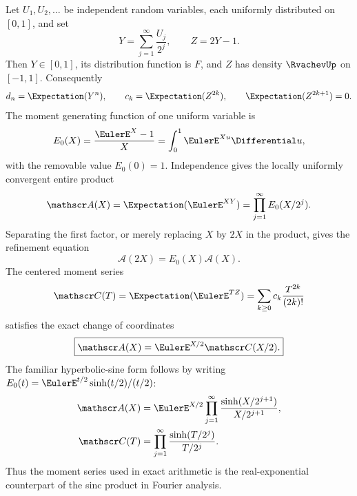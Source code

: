 \documentclass[11pt,oneside]{article}
\theoremstyle{definition}
\theoremstyle{remark}
\begin{document}
Let $U_1,U_2,\ldots$ be independent random variables, each uniformly distributed on
$[0,1]$, and set
\begin{equation}
 Y=\sum_{j=1}^{\infty}\frac{U_j}{2^j},
 \qquad Z=2Y-1.                                             \label{dyadicweb:eq:Y-Z-def}
\end{equation}
Then $Y\in[0,1]$, its distribution function is $F$, and $Z$ has density $\RvachevUp$ on $[-1,1]$.
Consequently
\begin{equation}
 d_n=\Expectation(Y^n),\qquad c_k=\Expectation(Z^{2k}),\qquad \Expectation(Z^{2k+1})=0. \label{dyadicweb:eq:prob-moments}
\end{equation}
The moment generating function of one uniform variable is
\[
 E_0(X)=\frac{\EulerE^X-1}{X}=\int_0^1\EulerE^{Xu}\Differential u,
\]
with the removable value $E_0(0)=1$.  Independence gives the locally uniformly convergent
entire product
\begin{equation}
 \mathscr A(X)=\Expectation(\EulerE^{XY})
 =\prod_{j=1}^{\infty}E_0(X/2^j).                          \label{dyadicweb:eq:A-product}
\end{equation}
Separating the first factor, or merely replacing $X$ by $2X$ in the product, gives the
refinement equation
\begin{equation}
 \mathscr A(2X)=E_0(X)\mathscr A(X).                       \label{dyadicweb:eq:A-refinement}
\end{equation}
The centered moment series
\begin{equation}
 \mathscr C(T)=\Expectation(\EulerE^{TZ})
 =\sum_{k\ge0}c_k\frac{T^{2k}}{(2k)!}                     \label{dyadicweb:eq:C-def}
\end{equation}
satisfies the exact change of coordinates
\begin{equation}
 \boxed{\mathscr A(X)=\EulerE^{X/2}\mathscr C(X/2).}           \label{dyadicweb:eq:A-C-transform}
\end{equation}
The familiar hyperbolic-sine form follows by writing
$E_0(t)=\EulerE^{t/2}\sinh(t/2)/(t/2)$:
\begin{align}
 \mathscr A(X)
 &=\EulerE^{X/2}\prod_{j=1}^{\infty}
   \frac{\sinh(X/2^{j+1})}{X/2^{j+1}},                    \label{dyadicweb:eq:A-sinh-product}\\
 \mathscr C(T)
 &=\prod_{j=1}^{\infty}\frac{\sinh(T/2^j)}{T/2^j}.        \label{dyadicweb:eq:C-sinh-product}
\end{align}
Thus the moment series used in exact arithmetic is the real-exponential counterpart of the
sinc product in Fourier analysis.
\end{document}
